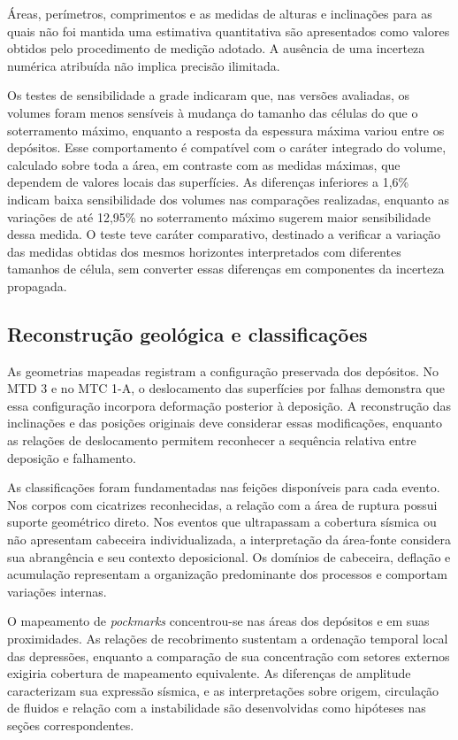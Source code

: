 Áreas, perímetros, comprimentos e as medidas de alturas e inclinações para as quais não foi mantida uma estimativa quantitativa são apresentados como valores obtidos pelo procedimento de medição adotado. A ausência de uma incerteza numérica atribuída não implica precisão ilimitada.

Os testes de sensibilidade a grade indicaram que, nas versões avaliadas, os volumes foram menos sensíveis à mudança do tamanho das células do que o soterramento máximo, enquanto a resposta da espessura máxima variou entre os depósitos. Esse comportamento é compatível com o caráter integrado do volume, calculado sobre toda a área, em contraste com as medidas máximas, que dependem de valores locais das superfícies. As diferenças inferiores a 1,6\% indicam baixa sensibilidade dos volumes nas comparações realizadas, enquanto as variações de até 12,95\% no soterramento máximo sugerem maior sensibilidade dessa medida. O teste teve caráter comparativo, destinado a verificar a variação das medidas obtidas dos mesmos horizontes interpretados com diferentes tamanhos de célula, sem converter essas diferenças em componentes da incerteza propagada.

\subsection{Reconstrução geológica e classificações}\label{sec:6-10-4}

As geometrias mapeadas registram a configuração preservada dos depósitos. No MTD 3 e no MTC 1-A, o deslocamento das superfícies por falhas demonstra que essa configuração incorpora deformação posterior à deposição. A reconstrução das inclinações e das posições originais deve considerar essas modificações, enquanto as relações de deslocamento permitem reconhecer a sequência relativa entre deposição e falhamento.

As classificações foram fundamentadas nas feições disponíveis para cada evento. Nos corpos com cicatrizes reconhecidas, a relação com a área de ruptura possui suporte geométrico direto. Nos eventos que ultrapassam a cobertura sísmica ou não apresentam cabeceira individualizada, a interpretação da área-fonte considera sua abrangência e seu contexto deposicional. Os domínios de cabeceira, deflação e acumulação representam a organização predominante dos processos e comportam variações internas.

O mapeamento de \textit{pockmarks} concentrou-se nas áreas dos depósitos e em suas proximidades. As relações de recobrimento sustentam a ordenação temporal local das depressões, enquanto a comparação de sua concentração com setores externos exigiria cobertura de mapeamento equivalente. As diferenças de amplitude caracterizam sua expressão sísmica, e as interpretações sobre origem, circulação de fluidos e relação com a instabilidade são desenvolvidas como hipóteses nas seções correspondentes.

